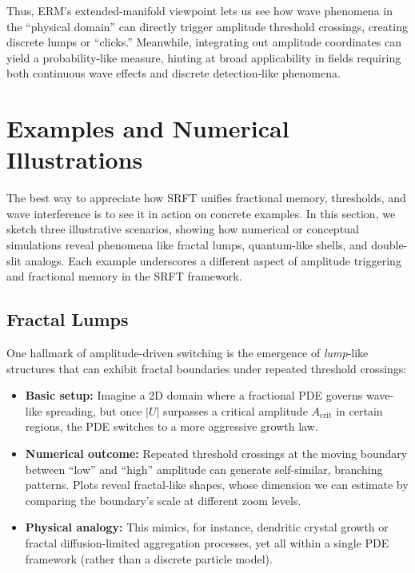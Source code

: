 \documentclass[12pt]{article}
\begin{document}
\noindent
Thus, ERM’s extended-manifold viewpoint lets us see how wave phenomena in
the “physical domain” can directly trigger amplitude threshold crossings,
creating discrete lumps or “clicks.” Meanwhile, integrating out amplitude coordinates
can yield a probability-like measure, hinting at broad applicability in fields
requiring both continuous wave effects and discrete detection-like phenomena.

\section{Examples and Numerical Illustrations}
\label{sec:examples}

The best way to appreciate how SRFT unifies fractional memory, thresholds, and
wave interference is to see it in action on concrete examples. In this section,
we sketch three illustrative scenarios, showing how numerical or conceptual
simulations reveal phenomena like fractal lumps, quantum-like shells, and
double-slit analogs. Each example underscores a different aspect of amplitude
triggering and fractional memory in the SRFT framework.

\subsection{Fractal Lumps}
\label{subsec:fractal_lumps}

One hallmark of amplitude-driven switching is the emergence of \emph{lump}-like
structures that can exhibit fractal boundaries under repeated threshold
crossings:
\begin{itemize}
    \item \textbf{Basic setup:}
    Imagine a 2D domain where a fractional PDE governs wave-like spreading,
    but once $|U|$ surpasses a critical amplitude $A_{\mathrm{crit}}$ in
    certain regions, the PDE switches to a more aggressive growth law.
    \item \textbf{Numerical outcome:}
    Repeated threshold crossings at the moving boundary between “low” and
    “high” amplitude can generate self-similar, branching patterns. Plots
    reveal fractal-like shapes, whose dimension we can estimate by comparing
    the boundary's scale at different zoom levels.
    \item \textbf{Physical analogy:}
    This mimics, for instance, dendritic crystal growth or fractal diffusion-limited
    aggregation processes, yet all within a single PDE framework (rather than a
    discrete particle model).
\end{itemize}
\end{document}
